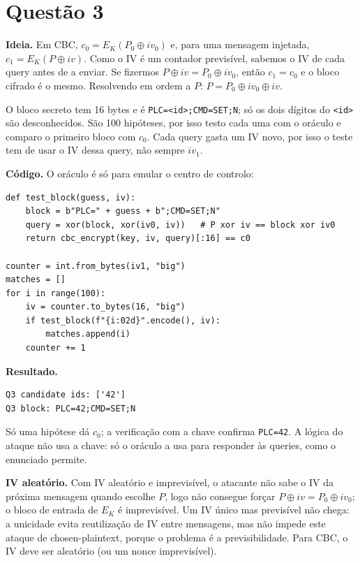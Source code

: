 \documentclass[11pt,a4paper]{article}
\begin{document}
\section*{Questão 3}

\textbf{Ideia.} Em CBC, $c_0 = E_K(P_0 \oplus iv_0)$ e, para uma mensagem
injetada, $c_1 = E_K(P \oplus iv)$. Como o IV é um contador previsível, sabemos
o IV de cada query antes de a enviar. Se fizermos $P \oplus iv = P_0 \oplus iv_0$,
então $c_1 = c_0$ e o bloco cifrado é o mesmo. Resolvendo em ordem a $P$:
$P = P_0 \oplus iv_0 \oplus iv$.

O bloco secreto tem 16 bytes e é \texttt{PLC=<id>;CMD=SET;N}; só os dois
dígitos do \texttt{<id>} são desconhecidos. São 100 hipóteses, por isso testo
cada uma com o oráculo e comparo o primeiro bloco com $c_0$. Cada query gasta
um IV novo, por isso o teste tem de usar o IV dessa query, não sempre $iv_1$.

\textbf{Código.} O oráculo é só para emular o centro de controlo:

\begin{verbatim}
def test_block(guess, iv):
    block = b"PLC=" + guess + b";CMD=SET;N"
    query = xor(block, xor(iv0, iv))   # P xor iv == block xor iv0
    return cbc_encrypt(key, iv, query)[:16] == c0

counter = int.from_bytes(iv1, "big")
matches = []
for i in range(100):
    iv = counter.to_bytes(16, "big")
    if test_block(f"{i:02d}".encode(), iv):
        matches.append(i)
    counter += 1
\end{verbatim}

\textbf{Resultado.}

\begin{verbatim}
Q3 candidate ids: ['42']
Q3 block: PLC=42;CMD=SET;N
\end{verbatim}

Só uma hipótese dá $c_0$; a verificação com a chave confirma
\texttt{PLC=42}. A lógica do ataque não usa a chave: só o oráculo a usa para
responder às queries, como o enunciado permite.

\textbf{IV aleatório.} Com IV aleatório e imprevisível, o atacante não sabe o
IV da próxima mensagem quando escolhe $P$, logo não consegue forçar
$P \oplus iv = P_0 \oplus iv_0$; o bloco de entrada de $E_K$ é
imprevisível. Um IV único mas previsível não chega: a unicidade evita
reutilização de IV entre mensagens, mas não impede este ataque de
chosen-plaintext, porque o problema é a previsibilidade. Para CBC, o IV deve
ser aleatório (ou um nonce imprevisível).
\end{document}
